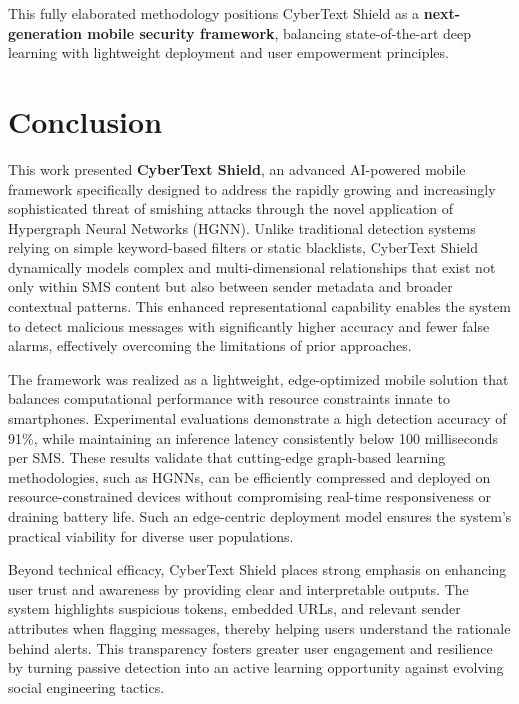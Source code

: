 \documentclass[conference]{IEEEtran}
\begin{document}
This fully elaborated methodology positions CyberText Shield as a \textbf{next-generation mobile security framework}, balancing state-of-the-art deep learning with lightweight deployment and user empowerment principles.



\section{Conclusion}
\IEEEoverridecommandlockouts

This work presented \textbf{CyberText Shield}, an advanced AI-powered mobile framework specifically designed to address the rapidly growing and increasingly sophisticated threat of smishing attacks through the novel application of Hypergraph Neural Networks (HGNN). Unlike traditional detection systems relying on simple keyword-based filters or static blacklists, CyberText Shield dynamically models complex and multi-dimensional relationships that exist not only within SMS content but also between sender metadata and broader contextual patterns. This enhanced representational capability enables the system to detect malicious messages with significantly higher accuracy and fewer false alarms, effectively overcoming the limitations of prior approaches.

The framework was realized as a lightweight, edge-optimized mobile solution that balances computational performance with resource constraints innate to smartphones. Experimental evaluations demonstrate a high detection accuracy of 91\%, while maintaining an inference latency consistently below 100 milliseconds per SMS. These results validate that cutting-edge graph-based learning methodologies, such as HGNNs, can be efficiently compressed and deployed on resource-constrained devices without compromising real-time responsiveness or draining battery life. Such an edge-centric deployment model ensures the system’s practical viability for diverse user populations.

Beyond technical efficacy, CyberText Shield places strong emphasis on enhancing user trust and awareness by providing clear and interpretable outputs. The system highlights suspicious tokens, embedded URLs, and relevant sender attributes when flagging messages, thereby helping users understand the rationale behind alerts. This transparency fosters greater user engagement and resilience by turning passive detection into an active learning opportunity against evolving social engineering tactics.
\end{document}
